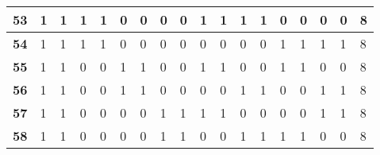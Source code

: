 \begin{center}
\begin{longtable}{|P{0.3cm}|P{0.3cm}|P{0.3cm}|P{0.3cm}|P{0.3cm}|P{0.3cm}|P{0.3cm}|P{0.3cm}|P{0.3cm}|P{0.3cm}|P{0.3cm}|P{0.3cm}|P{0.3cm}|P{0.3cm}|P{0.3cm}|P{0.3cm}|P{0.3cm}|P{1.4cm}|}
\textbf{53}                        & 1                     & 1                     & 1                     & 1                     & 0                     & 0                     & 0                     & 0                     & 1                     & 1                     & 1                     & 1                     & 0                     & 0                     & 0                     & 0                     & 8                     \\ \hline
\textbf{54}                        & 1                     & 1                     & 1                     & 1                     & 0                     & 0                     & 0                     & 0                     & 0                     & 0                     & 0                     & 0                     & 1                     & 1                     & 1                     & 1                     & 8                     \\ \hline
\textbf{55}                        & 1                     & 1                     & 0                     & 0                     & 1                     & 1                     & 0                     & 0                     & 1                     & 1                     & 0                     & 0                     & 1                     & 1                     & 0                     & 0                     & 8                     \\ \hline
\textbf{56}                        & 1                     & 1                     & 0                     & 0                     & 1                     & 1                     & 0                     & 0                     & 0                     & 0                     & 1                     & 1                     & 0                     & 0                     & 1                     & 1                     & 8                     \\ \hline
\textbf{57}                        & 1                     & 1                     & 0                     & 0                     & 0                     & 0                     & 1                     & 1                     & 1                     & 1                     & 0                     & 0                     & 0                     & 0                     & 1                     & 1                     & 8                     \\ \hline
\textbf{58}                        & 1                     & 1                     & 0                     & 0                     & 0                     & 0                     & 1                     & 1                     & 0                     & 0                     & 1                     & 1                     & 1                     & 1                     & 0                     & 0                     & 8                     \\ \hline

\end{longtable}
\end{center}
